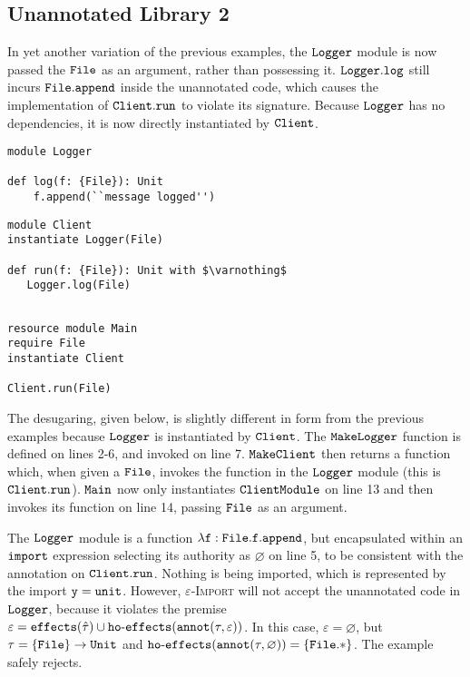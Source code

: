 \subsection{Unannotated Library 2}

In yet another variation of the previous examples, the $\mathtt{Logger}$ module is now passed the $\mathtt{File}$ as an argument, rather than possessing it. $\mathtt{Logger.log}$ still incurs $\mathtt{File.append}$ inside the unannotated code, which causes the implementation of $\mathtt{Client.run}$ to violate its signature. Because $\mathtt{Logger}$ has no dependencies, it is now directly instantiated by $\mathtt{Client}$.

\begin{lstlisting}
module Logger

def log(f: {File}): Unit
    f.append(``message logged'')
\end{lstlisting}

\begin{lstlisting}
module Client
instantiate Logger(File)

def run(f: {File}): Unit with $\varnothing$
   Logger.log(File)
   
\end{lstlisting}

\begin{lstlisting}
resource module Main
require File
instantiate Client

Client.run(File)
\end{lstlisting}

The desugaring, given below, is slightly different in form from the previous examples because $\mathtt{Logger}$ is instantiated by $\mathtt{Client}$. The $\mathtt{MakeLogger}$ function is defined on lines 2-6, and invoked on line 7. $\mathtt{MakeClient}$ then returns a function which, when given a $\mathtt{File}$, invokes the function in the $\mathtt{Logger}$ module (this is $\mathtt{Client.run}$). $\mathtt{Main}$ now only instantiates $\mathtt{ClientModule}$ on line 13 and then invokes its function on line 14, passing $\mathtt{File}$ as an argument.

The $\mathtt{Logger}$ module is a function $\mathtt{\lambda f: {File}. f.append}$, but encapsulated within an $\mathtt{import}$ expression selecting its authority as $\varnothing$ on line 5, to be consistent with the annotation on $\mathtt{Client.run}$. Nothing is being imported, which is represented by the import $\mathtt{y = unit}$. However, \textsc{$\varepsilon$-Import} will not accept the unannotated code in $\mathtt{Logger}$, because it violates the premise $\varepsilon = \mathtt{effects}(\hat \tau) \cup \mathtt{ho \hbox{-} effects}(\mathtt{annot}(\tau, \varepsilon))$. In this case, $\varepsilon = \varnothing$, but $\tau = \mathtt{ \{ File \} \rightarrow Unit}$ and $\mathtt{ho \hbox{-} effects}(\mathtt{annot}(\tau, \varnothing)) = \{ \mathtt{File.*} \}$. The example safely rejects.

